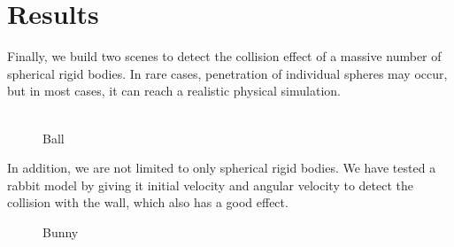 \documentclass[acmtog]{acmart}
\begin{document}
\section{Results}
Finally, we build two scenes to detect the collision effect of a massive number of spherical rigid bodies. In rare cases, penetration of individual spheres may occur, but in most cases, it can reach a realistic physical simulation.\\\\
\begin{figure}[htb]
	\caption{Ball}
\end{figure}
In addition, we are not limited to only spherical rigid bodies. We have tested a rabbit model by giving it initial velocity and angular velocity to detect the collision with the wall, which also has a good effect.
\begin{figure}[htb]
	\caption{Bunny}
\end{figure}
\end{document}
